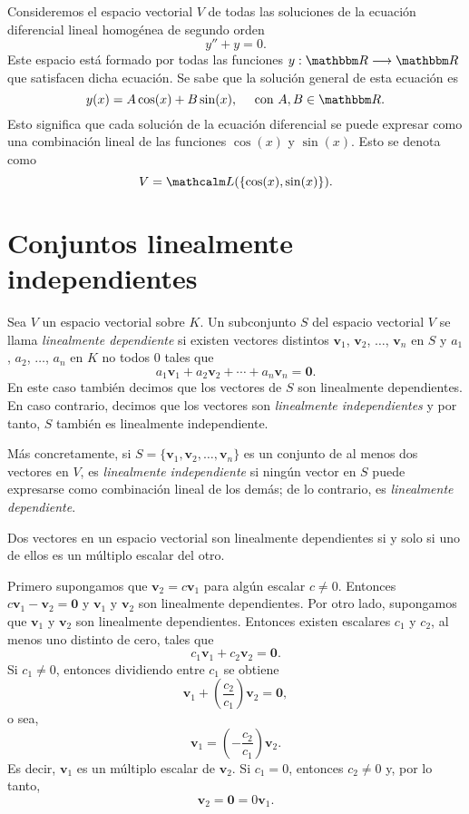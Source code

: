 \begin{examplebox}{}{}
    Consideremos el espacio vectorial $V$ de todas las soluciones de la ecuación diferencial lineal homogénea de segundo orden
    $$y'' + y = 0.$$
    Este espacio está formado por todas las funciones $y: \RR \longrightarrow \RR$ que satisfacen dicha ecuación. Se sabe que la solución general de esta ecuación es
    $$y(x) = A\cos (x) + B\sin (x), \quad \text{ con } A, B \in \RR .$$
    Esto significa que cada solución de la ecuación diferencial se puede expresar como una combinación lineal de las funciones $\cos (x)$ y $\sin (x)$. Esto se denota como
    $$V = \Gen(\{\cos (x), \sin (x)\}).$$
\end{examplebox}

\section{Conjuntos linealmente independientes}

\begin{definicion}{}{}
    Sea $V$ un espacio vectorial sobre $K$. Un subconjunto $S$ del espacio vectorial $V$ se llama \emph{linealmente dependiente} si existen vectores distintos $\mathbf{v}_1$, $\mathbf{v}_2$, $\dots$, $\mathbf{v}_n$ en $S$ y $a_1$, $a_2$, $\dots$, $a_n$ en $K$ no todos $0$ tales que
    $$a_1 \mathbf{v}_1 + a_2 \mathbf{v}_2 + \cdots + a_n \mathbf{v}_n = \mathbf{0}.$$
    En este caso también decimos que los vectores de $S$ son linealmente dependientes. En caso contrario, decimos que los vectores son \emph{linealmente independientes} y por tanto, $S$ también es linealmente independiente.
\end{definicion}

Más concretamente, si $S = \{\mathbf{v}_1, \mathbf{v}_2, \dots, \mathbf{v}_n\}$ es un conjunto de al menos dos vectores en $V$, es \emph{linealmente independiente} si ningún vector en $S$ puede expresarse como combinación lineal de los demás; de lo contrario, es \emph{linealmente dependiente}.

\newpage

\begin{theorem}{}{}
    Dos vectores en un espacio vectorial son linealmente dependientes si y solo si uno de ellos es un múltiplo escalar del otro.

    \tcblower
    \demostracion Primero supongamos que $\mathbf{v}_2 = c \mathbf{v}_1$ para algún escalar $c \neq 0$. Entonces $c \mathbf{v}_1 - \mathbf{v}_2 = \mathbf{0}$ y $\mathbf{v}_1$ y $\mathbf{v}_2$ son linealmente dependientes. Por otro lado, supongamos que $\mathbf{v}_1$ y $\mathbf{v}_2$ son linealmente dependientes. Entonces existen escalares $c_1$ y $c_2$, al menos uno distinto de cero, tales que
    $$c_1 \mathbf{v}_1 + c_2 \mathbf{v}_2 = \mathbf{0}.$$
    Si $c_1 \neq 0$, entonces dividiendo entre $c_1$ se obtiene
    $$\mathbf{v}_1 + \left(\frac{c_2}{c_1}\right) \mathbf{v}_2 = \mathbf{0},$$
    o sea,
    $$\mathbf{v}_1 = \left(-\frac{c_2}{c_1}\right) \mathbf{v}_2.$$
    Es decir, $\mathbf{v}_1$ es un múltiplo escalar de $\mathbf{v}_2$. Si $c_1 = 0$, entonces $c_2 \neq 0$ y, por lo tanto,
    $$\mathbf{v}_2 = \mathbf{0} = 0 \mathbf{v}_1.$$
\end{theorem}

